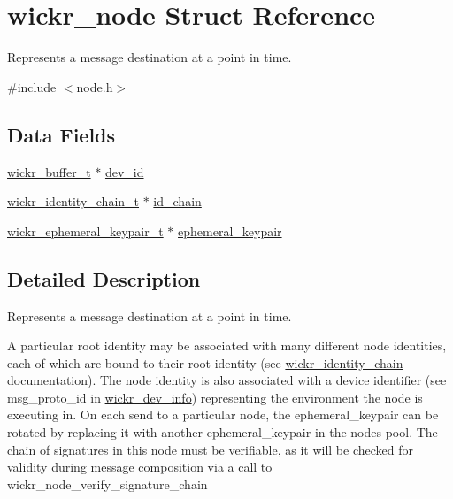 \hypertarget{structwickr__node}{}\section{wickr\+\_\+node Struct Reference}
\label{structwickr__node}


Represents a message destination at a point in time.  




{\ttfamily \#include $<$node.\+h$>$}

\subsection*{Data Fields}
\begin{DoxyCompactItemize}
\item 
\hyperlink{structwickr__buffer}{wickr\+\_\+buffer\+\_\+t} $\ast$ \hyperlink{structwickr__node_a564e42fc1d4b63353d74e5fbf0bead82}{dev\+\_\+id}
\item 
\hyperlink{structwickr__identity__chain}{wickr\+\_\+identity\+\_\+chain\+\_\+t} $\ast$ \hyperlink{structwickr__node_a3a5100ed26ae534e2070623713aacfde}{id\+\_\+chain}
\item 
\hyperlink{structwickr__ephemeral__keypair}{wickr\+\_\+ephemeral\+\_\+keypair\+\_\+t} $\ast$ \hyperlink{structwickr__node_a628b61eed5cb17b831ff687143393b93}{ephemeral\+\_\+keypair}
\end{DoxyCompactItemize}


\subsection{Detailed Description}
Represents a message destination at a point in time. 

A particular root identity may be associated with many different node identities, each of which are bound to their root identity (see \textquotesingle{}\hyperlink{structwickr__identity__chain}{wickr\+\_\+identity\+\_\+chain}\textquotesingle{} documentation). The node identity is also associated with a device identifier (see \textquotesingle{}msg\+\_\+proto\+\_\+id\textquotesingle{} in \textquotesingle{}\hyperlink{structwickr__dev__info}{wickr\+\_\+dev\+\_\+info}\textquotesingle{}) representing the environment the node is executing in. On each send to a particular node, the ephemeral\+\_\+keypair can be rotated by replacing it with another ephemeral\+\_\+keypair in the node\textquotesingle{}s pool. The chain of signatures in this node must be verifiable, as it will be checked for validity during message composition via a call to \textquotesingle{}wickr\+\_\+node\+\_\+verify\+\_\+signature\+\_\+chain\textquotesingle{} 

